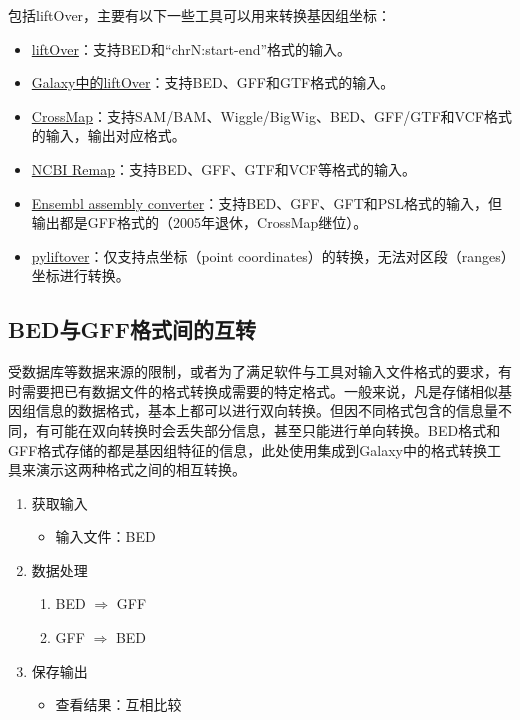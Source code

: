 \documentclass[11pt,a4paper,twoside]{book}
\begin{document}
包括liftOver，主要有以下一些工具可以用来转换基因组坐标：
\begin{itemize}
  \item \href{http://genome.ucsc.edu/cgi-bin/hgLiftOver}{liftOver}：支持BED和“chrN:start-end”格式的输入。
  \item \href{https://usegalaxy.org/}{Galaxy中的liftOver}：支持BED、GFF和GTF格式的输入。
  \item \href{http://crossmap.sourceforge.net/}{CrossMap}：支持SAM/BAM、Wiggle/BigWig、BED、GFF/GTF和VCF格式的输入，输出对应格式。
  \item \href{http://www.ncbi.nlm.nih.gov/genome/tools/remap}{NCBI Remap}：支持BED、GFF、GTF和VCF等格式的输入。
  \item \href{http://asia.ensembl.org/Homo\_sapiens/UserData/SelectFeatures}{Ensembl assembly converter}：支持BED、GFF、GFT和PSL格式的输入，但输出都是GFF格式的（2005年退休，CrossMap继位）。
  \item \href{https://pypi.python.org/pypi/pyliftover}{pyliftover}：仅支持点坐标（point coordinates）的转换，无法对区段（ranges）坐标进行转换。
\end{itemize}

\subsection{BED与GFF格式间的互转}
受数据库等数据来源的限制，或者为了满足软件与工具对输入文件格式的要求，有时需要把已有数据文件的格式转换成需要的特定格式。一般来说，凡是存储相似基因组信息的数据格式，基本上都可以进行双向转换。但因不同格式包含的信息量不同，有可能在双向转换时会丢失部分信息，甚至只能进行单向转换。BED格式和GFF格式存储的都是基因组特征的信息，此处使用集成到Galaxy中的格式转换工具来演示这两种格式之间的相互转换。
\begin{enumerate}
    \item 获取输入
      \begin{itemize}
        \item 输入文件：BED
      \end{itemize}
    \item 数据处理
      \begin{enumerate}
        \item BED $\Rightarrow$ GFF
        \item GFF $\Rightarrow$ BED
      \end{enumerate}
    \item 保存输出
      \begin{itemize}
        \item 查看结果：互相比较
      \end{itemize}
\end{enumerate}
\end{document}
